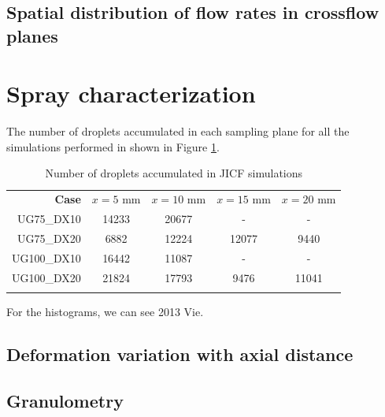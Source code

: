 \subsection{Spatial distribution of flow rates in crossflow planes}





\newpage

\section{Spray characterization}
\label{sec:ch5_sec_spray_characterization}

The number of droplets accumulated in each sampling plane for all the simulations performed in shown in Figure \ref{tab:jicf_Ndr_accumulated}.

\begin{table}[!h]
\centering
\caption{Number of droplets accumulated in JICF simulations}
\begin{tabular}{rcccc}
\thickhline
\textbf{Case} & $x = 5$ mm & $x = 10$ mm & $x = 15$ mm  & $x = 20$ mm \\
\thickhline 
UG75\_DX10  & 14233 & 20677 & - & - \\
UG75\_DX20  &  6882 & 12224 & 12077 & 9440 \\
UG100\_DX10 & 16442 & 11087 & - & -\\
UG100\_DX20 & 21824 & 17793 & 9476 & 11041 \\
\thickhline
\end{tabular}
\label{tab:jicf_Ndr_accumulated}
\end{table}

For the histograms, we can see 2013 Vie.


\subsection{Deformation variation with axial distance}

\subsection{Granulometry}

